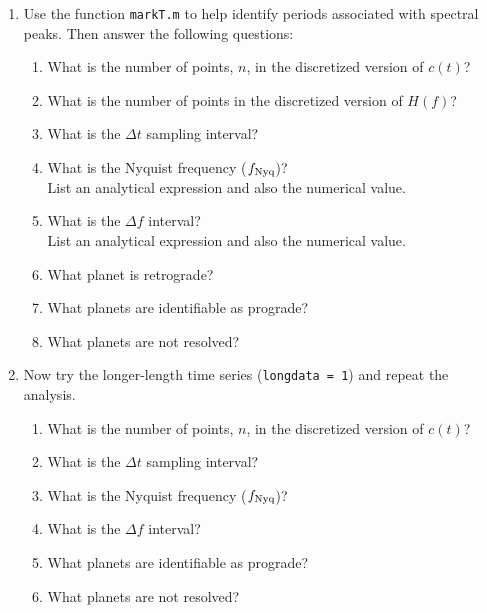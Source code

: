 \documentclass[11pt,titlepage,fleqn]{article}
\begin{document}
\begin{enumerate}
\item  Use the function \verb+markT.m+ to help identify periods associated with spectral peaks. Then answer the following questions:
%
\begin{enumerate}
\item What is the number of points, $n$, in the discretized version of $c(t)$?
\item What is the number of points in the discretized version of $H(f)$?
\item What is the $\Delta t$ sampling interval?
\item What is the Nyquist frequency ($f_{\rm Nyq}$)? \\
List an analytical expression and also the numerical value.
\item What is the $\Delta f$ interval? \\
List an analytical expression and also the numerical value.
\item What planet is retrograde?
\item What planets are identifiable as prograde?
\item What planets are not resolved?
\end{enumerate}

\item Now try the longer-length time series (\verb+longdata = 1+) and repeat the analysis.
%
\begin{enumerate}
\item What is the number of points, $n$, in the discretized version of $c(t)$?
\item What is the $\Delta t$ sampling interval?
\item What is the Nyquist frequency ($f_{\rm Nyq}$)?
\item What is the $\Delta f$ interval?
\item What planets are identifiable as prograde?
\item What planets are not resolved?
\end{enumerate}

\end{enumerate}

%
%

\end{document}
